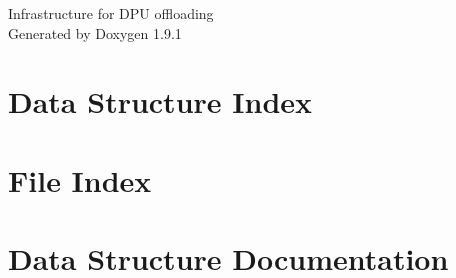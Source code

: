 \let\mypdfximage\pdfximage\def\pdfximage{\immediate\mypdfximage}\documentclass[twoside]{book}
\newcommand{\+}{\discretionary{\mbox{\scriptsize$\hookleftarrow$}}{}{}}
\newcommand{\clearemptydoublepage}{%
  \newpage{\pagestyle{empty}\cleardoublepage}%
}
\begin{document}
\raggedbottom

\hypersetup{pageanchor=false,
             bookmarksnumbered=true,
             pdfencoding=unicode
            }
\begin{titlepage}
\vspace*{7cm}
\begin{center}%
{\Large Infrastructure for DPU offloading }\\
\vspace*{1cm}
{\large Generated by Doxygen 1.9.1}\\
\end{center}
\end{titlepage}
\clearemptydoublepage
{}
\tableofcontents
\clearemptydoublepage
{}
\hypersetup{pageanchor=true}

\chapter{Data Structure Index}

\chapter{File Index}

\chapter{Data Structure Documentation}
























































\end{document}
